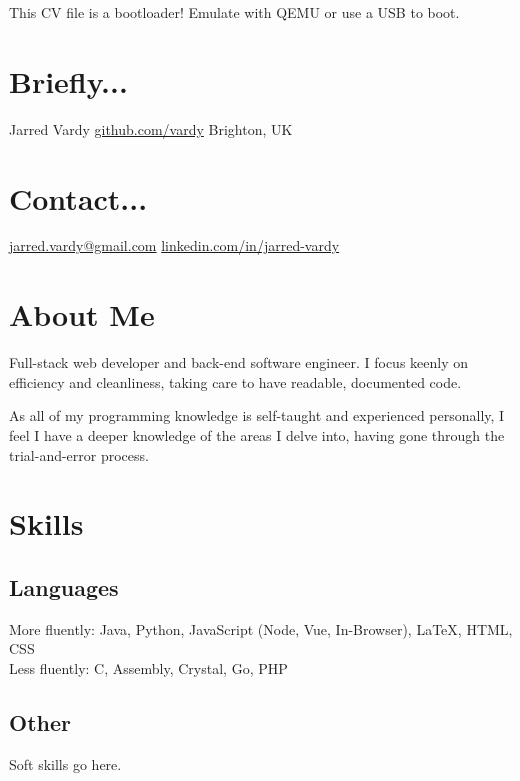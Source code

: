 \documentclass[]{jvcv}
\begin{document}
       {This CV file is a bootloader! Emulate with QEMU or use a USB to boot.}

%
\begin{aside}
	\section{Briefly...}\vspace{0.1cm}
	Jarred Vardy
	\hyperref[https://github.com/vardy/]{github.com/vardy}
	Brighton, UK
	\section{Contact...}\vspace{0.1cm}
	\hyperref[mailto:jarred.vardy@gmail.com]{jarred.vardy@gmail.com}
	\hyperref[https://linkedin.com/in/jarred-vardy]{linkedin.com/in/jarred-vardy}
\end{aside}

%
\section{About Me}
Full-stack web developer and back-end software engineer.
I focus keenly on efficiency and cleanliness, taking care to have readable, documented code.

As all of my programming knowledge is self-taught and experienced personally, I feel I have a
deeper knowledge of the areas I delve into, having gone through the trial-and-error process.

%
\vspace{0.5cm}
\section{Skills}
\subsection{Languages}
More fluently: Java, Python, JavaScript (Node, Vue, In-Browser), LaTeX, HTML, CSS\\
Less fluently: C, Assembly, Crystal, Go, PHP

\vspace{0.1cm}
\subsection{Other}
Soft skills go here.
\end{document}
